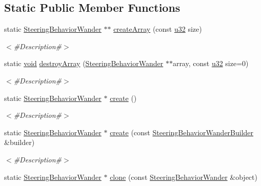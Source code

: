 \subsection*{Static Public Member Functions}
\begin{DoxyCompactItemize}
\item 
static \mbox{\hyperlink{classnjli_1_1_steering_behavior_wander}{Steering\+Behavior\+Wander}} $\ast$$\ast$ \mbox{\hyperlink{classnjli_1_1_steering_behavior_wander_a37ab46366d8e544c61aa6120012c7861}{create\+Array}} (const \mbox{\hyperlink{_util_8h_a10e94b422ef0c20dcdec20d31a1f5049}{u32}} size)
\begin{DoxyCompactList}\small\item\em $<$\#\+Description\#$>$ \end{DoxyCompactList}\item 
static \mbox{\hyperlink{_thread_8h_af1e856da2e658414cb2456cb6f7ebc66}{void}} \mbox{\hyperlink{classnjli_1_1_steering_behavior_wander_ae55c6adb6bde81015b70986049ffece2}{destroy\+Array}} (\mbox{\hyperlink{classnjli_1_1_steering_behavior_wander}{Steering\+Behavior\+Wander}} $\ast$$\ast$array, const \mbox{\hyperlink{_util_8h_a10e94b422ef0c20dcdec20d31a1f5049}{u32}} size=0)
\begin{DoxyCompactList}\small\item\em $<$\#\+Description\#$>$ \end{DoxyCompactList}\item 
static \mbox{\hyperlink{classnjli_1_1_steering_behavior_wander}{Steering\+Behavior\+Wander}} $\ast$ \mbox{\hyperlink{classnjli_1_1_steering_behavior_wander_a57dab62e80c4236d2fba9a6cab78ae7f}{create}} ()
\begin{DoxyCompactList}\small\item\em $<$\#\+Description\#$>$ \end{DoxyCompactList}\item 
static \mbox{\hyperlink{classnjli_1_1_steering_behavior_wander}{Steering\+Behavior\+Wander}} $\ast$ \mbox{\hyperlink{classnjli_1_1_steering_behavior_wander_ae2796d13bfc81d2081d5cd06d1852647}{create}} (const \mbox{\hyperlink{classnjli_1_1_steering_behavior_wander_builder}{Steering\+Behavior\+Wander\+Builder}} \&builder)
\begin{DoxyCompactList}\small\item\em $<$\#\+Description\#$>$ \end{DoxyCompactList}\item 
static \mbox{\hyperlink{classnjli_1_1_steering_behavior_wander}{Steering\+Behavior\+Wander}} $\ast$ \mbox{\hyperlink{classnjli_1_1_steering_behavior_wander_ad42ad6cdb3eb7e6b479f6faa314cb991}{clone}} (const \mbox{\hyperlink{classnjli_1_1_steering_behavior_wander}{Steering\+Behavior\+Wander}} \&object)

\end{DoxyCompactItemize}
